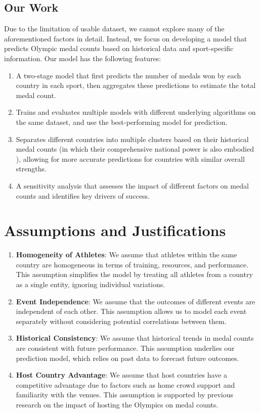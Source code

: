 \documentclass{mcmthesis}
\begin{document}
\subsection{Our Work}

Due to the limitation of usable dataset, we cannot explore many of the aforementioned factors in detail. Instead, we focus on developing a model that predicts Olympic medal counts based on historical data and sport-specific information. Our model has the following features:

\begin{enumerate}
    \item A two-stage model that first predicts the number of medals won by each country in each sport, then aggregates these predictions to estimate the total medal count.
    \item Trains and evaluates multiple models with different underlying algorithms on the same dataset, and use the best-performing model for prediction.
    \item Separates different countries into multiple clusters based on their historical medal counts (in which their comprehensive national power is also embodied \cite{7}), allowing for more accurate predictions for countries with similar overall strengths.
    \item A sensitivity analysis that assesses the impact of different factors on medal counts and identifies key drivers of success. 
\end{enumerate}

\section{Assumptions and Justifications} 

\begin{enumerate}
    \item \textbf{Homogeneity of Athletes}: We assume that athletes within the same country are homogeneous in terms of training, resources, and performance. This assumption simplifies the model by treating all athletes from a country as a single entity, ignoring individual variations.
    \item \textbf{Event Independence}: We assume that the outcomes of different events are independent of each other. This assumption allows us to model each event separately without considering potential correlations between them.
    \item \textbf{Historical Consistency}: We assume that historical trends in medal counts are consistent with future performance. This assumption underlies our prediction model, which relies on past data to forecast future outcomes.
    \item \textbf{Host Country Advantage}: We assume that host countries have a competitive advantage due to factors such as home crowd support and familiarity with the venues. This assumption is supported by previous research on the impact of hosting the Olympics on medal counts.
    
\end{enumerate}
\end{document}
